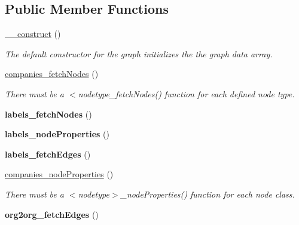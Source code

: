 \subsection*{Public Member Functions}
\begin{DoxyCompactItemize}
\item 
\hyperlink{classContributionGraph_a38e1cdf68fb42882fba9985ad277a60b}{\_\-\_\-construct} ()
\begin{DoxyCompactList}\small\item\em The default constructor for the graph initializes the the graph data array. \item\end{DoxyCompactList}\item 
\hyperlink{classContributionGraph_af2457f0e657749f0331b8121a213e295}{companies\_\-fetchNodes} ()
\begin{DoxyCompactList}\small\item\em There must be a $<$nodetype\_\-fetchNodes() function for each defined node type. \item\end{DoxyCompactList}\item 
\hypertarget{classContributionGraph_a5aff57cf53661c0fcff1222f2c7d08e4}{
{\bfseries labels\_\-fetchNodes} ()}
\label{classContributionGraph_a5aff57cf53661c0fcff1222f2c7d08e4}

\item 
\hypertarget{classContributionGraph_a6ef608b704b3e185e21f1198804639ea}{
{\bfseries labels\_\-nodeProperties} ()}
\label{classContributionGraph_a6ef608b704b3e185e21f1198804639ea}

\item 
\hypertarget{classContributionGraph_ade50723c7e0ee7907abd38ed83cc9527}{
{\bfseries labels\_\-fetchEdges} ()}
\label{classContributionGraph_ade50723c7e0ee7907abd38ed83cc9527}

\item 
\hyperlink{classContributionGraph_a1f28a16dbd9e3e01f86d1dafd413aa10}{companies\_\-nodeProperties} ()
\begin{DoxyCompactList}\small\item\em There must be a $<$nodetype$>$\_\-nodeProperties() function for each node class. \item\end{DoxyCompactList}\item 
\hypertarget{classContributionGraph_a6867c2126b2b6982cd6be87c9dd81ebc}{
{\bfseries org2org\_\-fetchEdges} ()}
\label{classContributionGraph_a6867c2126b2b6982cd6be87c9dd81ebc}


\end{DoxyCompactItemize}
